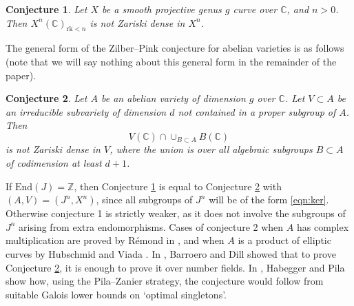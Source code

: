 \documentclass{amsart}
\def\Z{\mathbb Z}
\def\C{\mathbb C}
\newcommand{\rk}{\mathrm{rk}}
\newcommand{\End}{\mathrm{End}}
\theoremstyle{plain}
\newtheorem{conjecture}{Conjecture}
\theoremstyle{definition}
\begin{document}
\begin{conjecture}\label{conj1}
Let $X$ be a smooth projective genus $g$ curve over $\mathbb{C}$, and $n>0$. Then $X^n (\mathbb{C})_{\rk <n}$ is not Zariski dense in $X^n$.
\end{conjecture}
The general form of the Zilber--Pink conjecture for abelian varieties is as follows (note that we will say nothing about this general form in the remainder of the paper).
\begin{conjecture}\label{conj2}
Let $A$ be an abelian variety of dimension $g$ over $\mathbb{C}$. Let $V\subset A$ be an irreducible subvariety of dimension $d$ not contained in a proper subgroup of $A$. Then 
\[
V(\C )\cap \cup _{B\subset A}B(\C )
\]
is not Zariski dense in $V$, where the union is over all algebraic subgroups $B\subset A$ of codimension at least $d+1$.
\end{conjecture}
If $\End (J)=\Z $, then Conjecture \ref{conj1} is equal to Conjecture \ref{conj2} with $(A,V)=(J^n ,X^n )$, since all subgroups of $J^n$ will be of the form \eqref{eqn:ker}. Otherwise conjecture 1 is strictly weaker, as it does not involve the subgroups of $J^n$ arising from extra endomorphisms. Cases of conjecture 2 when $A$ has complex multiplication are proved by R\'emond in \cite{rem3}, and when $A$ is a product of elliptic curves by Hubschmid and Viada \cite{HV}. In \cite{BD22}, Barroero and Dill showed that to prove Conjecture \ref{conj2}, it is enough to prove it over number fields. In \cite{HP}, Habegger and Pila show how, using the Pila--Zanier strategy, the conjecture would follow from suitable Galois lower bounds on `optimal singletons'.
\end{document}
